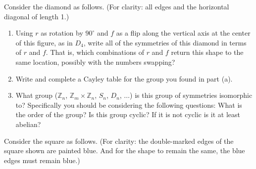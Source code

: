 
\newcommand{\Z}{\mathbb{Z}}
\newcommand{\abar}{\overline{a}}
\usepackage{tikz,enumitem}
\usetikzlibrary {shapes.geometric}


Consider the diamond as follows. (For clarity: all edges and the horizontal diagonal of length 1.)

	\begin{center}
	\end{center}
	
	\begin{enumerate}[label=(\alph*)]
		\item Using $r$ as rotation by $90^\circ$ and $f$ as a flip along the vertical axis at the center of this figure, as in $D_4$, write all of the symmetries of this diamond in terms of $r$ and $f$.  That is, which combinations of $r$ and $f$ return this shape to the same location, possibly with the numbers swapping?
		\vskip 2in
		\item Write and complete a Cayley table for the group you found in part (a).
		\vfill 
		\item What group ($\Z_n$, $\Z_m\times\Z_n$, $S_n$, $D_n$, $\dots$) is this group of symmetries isomorphic to? Specifically you should be considering the following questions: What is the order of the group? Is this group cyclic? If it is not cyclic is it at least abelian?
		\vskip 1in
	\end{enumerate}
	

Consider the square as follows. (For clarity: the double-marked edges of the square shown are painted blue. And for the shape to remain the same, the blue edges must remain blue.)

	\begin{center}
	\end{center}
	
